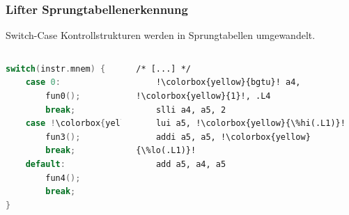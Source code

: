 \begin{frame}[fragile]
    \frametitle{Lifter Sprungtabellenerkennung}{Switch-Case Kontrollstrukturen werden in Sprungtabellen umgewandelt.}\vspace{1em}
    \begin{columns}[c]
        \begin{lstlisting}[language=c, escapechar=!]
switch(instr.mnem) {
    case 0:
        fun0();
        break;
    case !\colorbox{yellow}{1}!:
        fun3();
        break;
    default:
        fun4();
        break;
}
        \end{lstlisting}
        \begin{lstlisting}[language=rv64, escapechar=!]
/* [...] */
    !\colorbox{yellow}{bgtu}! a4, !\colorbox{yellow}{1}!, .L4
    slli a4, a5, 2
    lui a5, !\colorbox{yellow}{\%hi(.L1)}!
    addi a5, a5, !\colorbox{yellow}{\%lo(.L1)}!
    add a5, a4, a5

\end{lstlisting}
\end{columns}
\end{frame}

